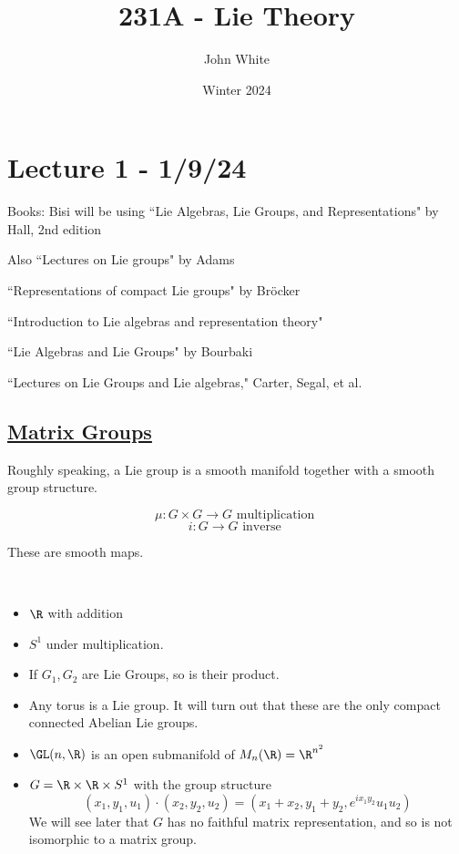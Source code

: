\documentclass[x11names,reqno,14pt]{extarticle}
\title{231A - Lie Theory}
\author{John White}
\date{Winter 2024}
\begin{document}
\section*{Lecture 1 - 1/9/24}

Books: Bisi will be using ``Lie Algebras, Lie Groups, and Representations" by Hall, 2nd edition

Also ``Lectures on Lie groups" by Adams

``Representations of compact Lie groups" by Br\"ocker

``Introduction to Lie algebras and representation theory"

``Lie Algebras and Lie Groups" by Bourbaki 

``Lectures on Lie Groups and Lie algebras," Carter, Segal, et al.

\subsection*{\underline{Matrix Groups}}

Roughly speaking, a Lie group is a smooth manifold together with a smooth group structure. 

\[
\mu:G\times G \to G\text{ multiplication }
\]
\[
i:G\to G \text{ inverse } 
\]

These are smooth maps. 

\exm
\,

\begin{itemize}

\item $\R$ with addition

\item $S^1$ under multiplication.

\item If $G_1, G_2$ are Lie Groups, so is their product. 

\item Any torus is a Lie group. It will turn out that these are the only compact connected Abelian Lie groups.

\item $\GL(n,\R)$ is an open submanifold of $M_n(\R) = \R^{n^2}$

\item $G = \R \times \R \times S^1$ with the group structure 
\[
(x_1, y_1, u_1) \cdot (x_2, y_2, u_2) = (x_1 + x_2, y_1 + y_2, e^{ix_1y_2}u_1u_2)
\]
We will see later that $G$ has no faithful matrix representation, and so is not isomorphic to a matrix group. 

\end{itemize}
\end{document}
